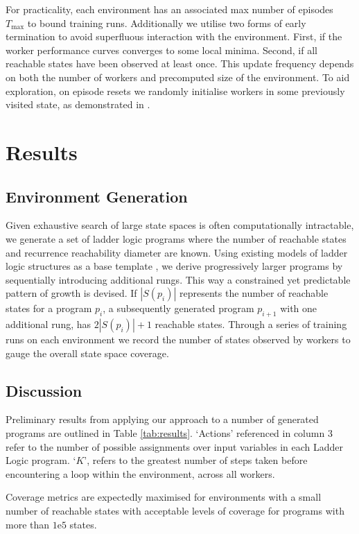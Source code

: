 \documentclass[runningheads]{llncs}
\begin{document}
For practicality, each environment has an associated max number of episodes $T_{\max}$ to bound training runs. Additionally we utilise two forms of early termination to avoid superfluous interaction with the environment. First, if the worker performance curves converges to some local minima. Second, if all reachable states have been observed at least once. This update frequency depends on both the number of workers and precomputed size of the environment. To aid exploration, on episode resets we randomly initialise workers in some previously visited state, as demonstrated in \cite{gordillo2021improving}. 


\section{Results}

\subsection{Environment Generation}

Given exhaustive search of large state spaces is often computationally intractable, we generate a set of ladder logic programs where the number of reachable states and recurrence reachability diameter are known. Using existing models of ladder logic structures as a base template \cite{james2013verification}, we derive progressively larger programs by sequentially introducing additional rungs. This way a constrained yet predictable pattern of growth is devised. If $|S(p_i)|$ represents the number of reachable states for a program $p_i$, a subsequently generated program $p_{i+1}$ with one additional rung, has $2|S(p_i)|+1$ reachable states. Through a series of training runs on each environment we record the number of states observed by workers to gauge the overall state space coverage. 


\subsection{Discussion}
Preliminary results from applying our approach to a number of generated programs are outlined in Table \ref{tab:results}. `Actions' referenced in column 3 refer to the number of possible assignments over input variables in each Ladder Logic program. `$K$', refers to the greatest number of steps taken before encountering a loop within the environment, across all workers.

Coverage metrics are expectedly maximised for environments with a small number of reachable states with acceptable levels of coverage for programs with more than $1\mathrm{e}{5}$ states. 
\end{document}
